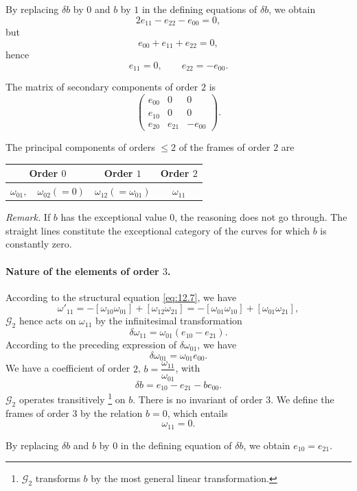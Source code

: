 \documentclass[leqno,11pt]{book}
\numberwithin{equation}{chapter}
\theoremstyle{shape1}
\theoremstyle{shapesmall}
\newcommand{\somespace}{\vspace{9pt}}
\begin{document}
By replacing $\delta b$ by $0$ and $b$ by $1$ in the defining equations of $\delta b$, we obtain
\[
2e_{11}-e_{22}-e_{00}=0,
\]
but
\[
e_{00}+e_{11}+e_{22}=0,
\]
hence
\[
e_{11}=0,\qquad e_{22}=-e_{00}.
\]

The matrix of secondary components of order $2$ is 
\[
\begin{pmatrix}
  e_{00}&0&0\\
  e_{10}&0&0\\
  e_{20}&e_{21}&-e_{00}
\end{pmatrix}.
\]

The principal components of orders $\le 2$ of the frames of order $2$ are
\begin{center}  
\begin{tabular}{|c|c|c|}
  \hline
  Order $0$&Order $1$&Order $2$\\
  \hline
  $\omega_{01},\quad\omega_{02}(=0)$&$\omega_{12}(=\omega_{01})$&$\omega_{11}$\\
  \hline
\end{tabular}
\end{center}

\somespace

\emph{Remark.} If $b$ has the exceptional value $0$, the reasoning does not go through. The straight lines constitute the exceptional category of the curves for which $b$ is constantly zero.

\paragraph{Nature of the elements of order $3$.}
\label{sec:177}
According to the structural equation \eqref{eq:12.7}, we have
\[
\omega'_{11}=-[\omega_{10}\omega_{01}]+[\omega_{12}\omega_{21}]=-[\omega_{01}\omega_{10}]+[\omega_{01}\omega_{21}],
\]
$\mathcal{G}_{2}$ hence acts on $\omega_{11}$ by the infinitesimal transformation
\[
\delta\omega_{11}=\omega_{01}(e_{10}-e_{21}).
\]
According to the preceding expression of $\delta\omega_{01}$, we have
\[
\delta\omega_{01}=\omega_{01}e_{00}.
\]
We have a coefficient of order $2$, $b=\dfrac{\omega_{11}}{\omega_{01}}$, with
\[
\delta b=e_{10}-e_{21}-be_{00}.
\]
$\mathcal{G}_{2}$ operates transitively \footnote{$\mathcal{G}_{2}$ transforms $b$ by the most general linear transformation.} on $b$. There is no invariant of order $3$. We define the frames of order $3$ by the relation $b=0$, which entails \[\omega_{11}=0.\]

By replacing $\delta b$ and $b$ by $0$ in the defining equation of $\delta b$, we obtain $e_{10}=e_{21}$.
\end{document}
